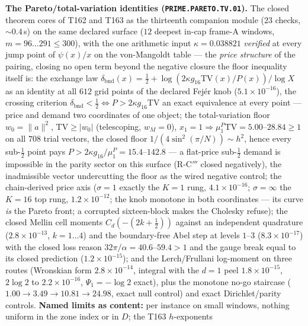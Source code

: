 \par\smallskip\noindent\textbf{The Pareto/total-variation identities
(\texttt{PRIME.PARETO.TV.01}).}
The closed theorem cores of T162 and T163 as the thirteenth companion
module ($23$ checks, ${\sim}0.4$\,s) on the same declared surface ($12$
deepest in-cap frame-A windows, $m=96\ldots291\le300$), with the one
arithmetic input $\kappa=0.038821$ \emph{verified} at every jump point
of $\psi(x)/x$ on the von-Mangoldt table --- the \emph{price structure}
of the pairing, closing no open term beyond the negative closure the
floor inequality itself is: the exchange law
$\delta_{\mathrm{bnd}}(x)=\tfrac12+\log(2\kappa g_{16}\mathrm{TV}(x)/P(x))/\log X$
as an identity at all $612$ grid points of the declared Fej\'er knob
($5.1\times10^{-16}$), the crossing criterion
$\delta_{\mathrm{bnd}}<\tfrac12\iff P>2\kappa g_{16}\mathrm{TV}$ an
exact equivalence at every point --- price and demand two coordinates of
one object; the total-variation floor $w_0=\|a\|^2$, $\mathrm{TV}\ge
|w_0|$ (telescoping, $w_M=0$), $x_1=1\Rightarrow
\mu^P_1\mathrm{TV}=5.00$--$28.84\ge1$ on all $708$ trial vectors, the
closed floor $1/(4\sin^2(\pi/N))\sim h^2$, hence every sub-$\tfrac12$
point pays $P>2\kappa g_{16}/\mu^P_1=15.4$--$142.8$ --- a flat-price
sub-$\tfrac12$ demand is impossible in the parity sector on this
surface (R-C$'''$ closed negatively), the inadmissible vector
undercutting the floor as the wired negative control; the chain-derived
price axis ($\sigma=1$ exactly the $K=1$ rung, $4.1\times10^{-16}$;
$\sigma=\infty$ the $K=16$ top rung, $1.2\times10^{-12}$; the knob
monotone in both coordinates --- its curve \emph{is} the Pareto front;
a corrupted sixteen-block makes the Cholesky refuse); the closed Mellin
cell moments $C_d(-(2k+\tfrac12))$ against an independent quadrature
($2.8\times10^{-13}$, $k=1\ldots4$) and the boundary-free Abel step at
levels $1$--$3$ ($8.3\times10^{-17}$) with the closed loss reason
$32\pi/\alpha=40.6$--$59.4>1$ and the gauge break equal to its closed
prediction ($1.2\times10^{-15}$); and the Lerch/Frullani log-moment on
three routes (Wronskian form $2.8\times10^{-14}$, integral with the
$d=1$ peel $1.8\times10^{-15}$, $2\log2$ to $2.2\times10^{-16}$,
$\Psi_1=-\log2$ exact), plus the monotone no-go staircase
($1.00\to3.49\to10.81\to24.98$, exact null control) and exact
Dirichlet/parity controls.
\textbf{Named limits as content:} per instance on small windows,
nothing uniform in the zone index or in $D$; the T163 $h$-exponents
